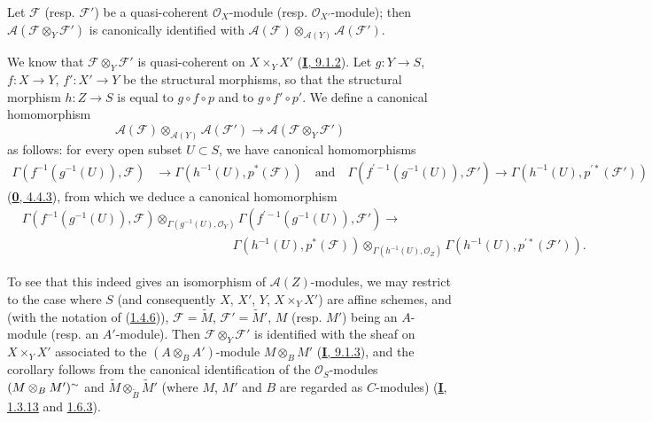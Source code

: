 \begin{corollary}[1.4.7]
\label{II.1.4.7}
Let $\mathcal{F}$ \textup{(resp. $\mathcal{F}'$)} be a quasi-coherent
$\mathcal{O}_X$-module \textup{(resp.} $\mathcal{O}_{X'}$-module); then
$\mathcal{A}(\mathcal{F}\otimes_Y\mathcal{F}')$ is canonically identified
with $\mathcal{A}(\mathcal{F})\otimes_{\mathcal{A}(Y)}
\mathcal{A}(\mathcal{F}')$.
\end{corollary}

We know that $\mathcal{F}\otimes_Y\mathcal{F}'$ is quasi-coherent on
$X\times_Y X'$ (\hyperref[I.9.1.2]{\textbf{I}, 9.1.2}). Let $g:Y\to S$,
$f:X\to Y$, $f':X'\to Y$ be the structural morphisms, so that the
structural morphism
$h:Z\to S$ is equal to $g\circ f\circ p$ and to $g\circ f'\circ p'$. We
define a canonical homomorphism
\[
  \mathcal{A}(\mathcal{F})\otimes_{\mathcal{A}(Y)}\mathcal{A}(\mathcal{F}')
  \longrightarrow \mathcal{A}(\mathcal{F}\otimes_Y\mathcal{F}')
\]
as follows: for every open subset $U\subset S$, we have canonical
homomorphisms
\[
  \begin{aligned}
  \Gamma(f^{-1}(g^{-1}(U)),\mathcal{F})
  &\longrightarrow \Gamma(h^{-1}(U),p^*(\mathcal{F}))\quad\text{and}\quad
  \Gamma(f^{\prime-1}(g^{-1}(U)),\mathcal{F}')
  \longrightarrow \Gamma(h^{-1}(U),p^{\prime*}(\mathcal{F}'))
  \end{aligned}
\]
(\hyperref[0.4.4.3]{\textbf{0}, 4.4.3}), from which we deduce a canonical
homomorphism
\[
  \begin{aligned}
  &\Gamma(f^{-1}(g^{-1}(U)),\mathcal{F})
    \otimes_{\Gamma(g^{-1}(U),\mathcal{O}_Y)}
    \Gamma(f^{\prime-1}(g^{-1}(U)),\mathcal{F}')\longrightarrow\\
  &\hspace{17em}
    \Gamma(h^{-1}(U),p^*(\mathcal{F}))
    \otimes_{\Gamma(h^{-1}(U),\mathcal{O}_Z)}
    \Gamma(h^{-1}(U),p^{\prime*}(\mathcal{F}')).
  \end{aligned}
\]

To see that this indeed gives an isomorphism of $\mathcal{A}(Z)$-modules, we
may restrict to the case where $S$ (and consequently $X$, $X'$, $Y$,
$X\times_Y X'$) are affine schemes, and (with the notation of
(\hyperref[II.1.4.6]{1.4.6})), $\mathcal{F}=\widetilde{M}$,
$\mathcal{F}'=\widetilde{M}'$, $M$ (resp. $M'$) being an $A$-module (resp.
an $A'$-module). Then $\mathcal{F}\otimes_Y\mathcal{F}'$ is identified with
the sheaf on $X\times_Y X'$ associated to the $(A\otimes_B A')$-module
$M\otimes_B M'$ (\hyperref[I.9.1.3]{\textbf{I}, 9.1.3}), and the corollary follows
from the canonical identification of the $\mathcal{O}_S$-modules
$(M\otimes_B M')^{\sim}$ and
$\widetilde{M}\otimes_{\widetilde{B}}\widetilde{M}'$ (where $M$, $M'$ and
$B$ are regarded as $C$-modules)
(\hyperref[I.1.3.13]{\textbf{I}, 1.3.13} and
\hyperref[I.1.6.3]{1.6.3}).

